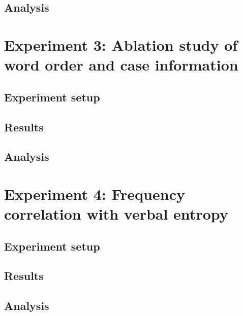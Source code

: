 \subsection{Analysis}

\section{Experiment 3: Ablation study of word order and case information}
\subsection{Experiment setup}
\subsection{Results}
\subsection{Analysis}

\section{Experiment 4: Frequency correlation with verbal entropy}
\subsection{Experiment setup}
\subsection{Results}
\subsection{Analysis}